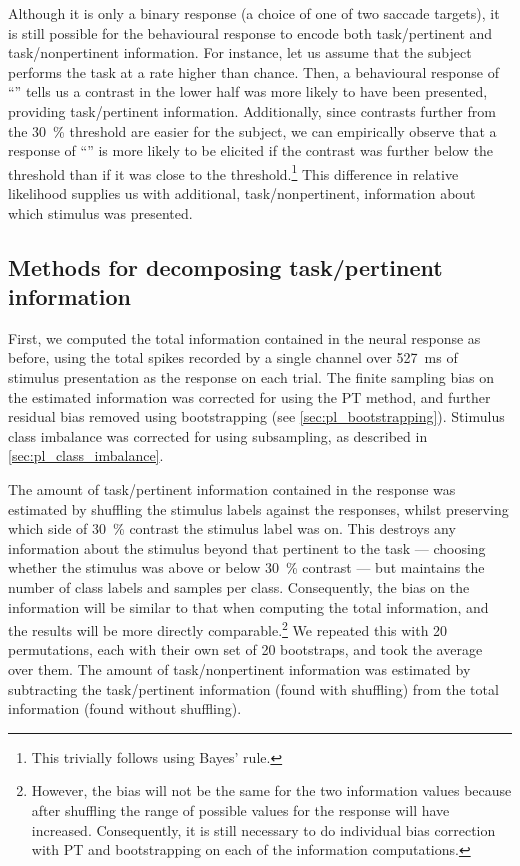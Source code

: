 Although it is only a binary response (a choice of one of two saccade targets), it is still possible for the behavioural response to encode both task\-/pertinent and task\-/nonpertinent information.
For instance, let us assume that the subject performs the task at a rate higher than chance.
Then, a behavioural response of ``'' tells us a contrast in the lower half was more likely to have been presented, providing task\-/pertinent information.
Additionally, since contrasts further from the \SI{30}{\percent} threshold are easier for the subject, we can empirically observe that a response of ``'' is more likely to be elicited if the contrast was further below the threshold than if it was close to the threshold.\footnote{This trivially follows using Bayes' rule.}
This difference in relative likelihood supplies us with additional, task\-/nonpertinent, information about which stimulus was presented.


\subsection{Methods for decomposing task\-/pertinent information}
\label{sec:task-info-methods}

First, we computed the total information contained in the neural response as before, using the total spikes recorded by a single channel over \SI{527}{\milli\second} of stimulus presentation as the response on each trial.
The finite sampling bias on the estimated information was corrected for using the \ac{PT} method, and further residual bias removed using bootstrapping (see \autoref{sec:pl_bootstrapping}).
Stimulus class imbalance was corrected for using subsampling, as described in \autoref{sec:pl_class_imbalance}.

The amount of task\-/pertinent information contained in the response was estimated by shuffling the stimulus labels against the responses, whilst preserving which side of \SI{30}{\percent} contrast the stimulus label was on.
This destroys any information about the stimulus beyond that pertinent to the task --- choosing whether the stimulus was above or below \SI{30}{\percent} contrast --- but maintains the number of class labels and samples per class.
Consequently, the bias on the information will be similar to that when computing the total information, and the results will be more directly comparable.\footnote{However, the bias will not be the same for the two information values because after shuffling the range of possible values for the response will have increased. Consequently, it is still necessary to do individual bias correction with \ac{PT} and bootstrapping on each of the information computations.}
We repeated this with \num{20} permutations, each with their own set of \num{20} bootstraps, and took the average over them.
The amount of task\-/nonpertinent information was estimated by subtracting the task\-/pertinent information (found with shuffling) from the total information (found without shuffling).

